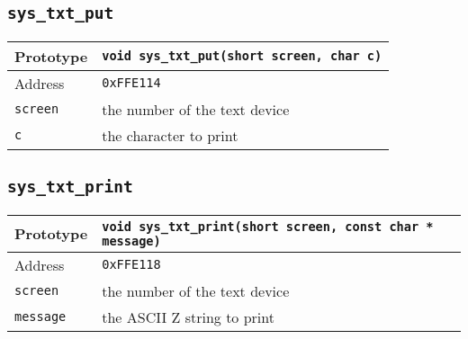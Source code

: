 \subsection*{\texttt{sys\_txt\_put}}
\begin{tabular}{|l||l|} \hline
Prototype & \lstinline!void sys_txt_put(short screen, char c)! \\ \hline
Address & \texttt{0xFFE114} \\ \hline
\lstinline!screen! & the number of the text device \\ \hline
\lstinline!c! & the character to print \\ \hline
\end{tabular}

\subsection*{\texttt{sys\_txt\_print}}
\begin{tabular}{|l||l|} \hline
Prototype & \lstinline!void sys_txt_print(short screen, const char * message)! \\ \hline
Address & \texttt{0xFFE118} \\ \hline
\lstinline!screen! & the number of the text device \\ \hline
\lstinline!message! & the ASCII Z string to print \\ \hline
\end{tabular}
